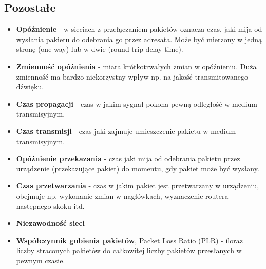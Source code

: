 \documentclass[a4paper]{article}
\begin{document}
\subsection{Pozostałe}
\begin{itemize}
    \item \textbf{Opóźnienie} - w sieciach z przełączaniem pakietów oznacza czas, jaki
mija od wysłania pakietu do odebrania go przez adresata. Może być mierzony w jedną stronę
(one way) lub w dwie (round-trip delay time).
    \item \textbf{Zmienność opóźnienia} - miara krótkotrwałych zmian w opóźnieniu.
Duża zmienność ma bardzo niekorzystny wpływ np. na jakość transmitowanego dźwięku.
    \item \textbf{Czas propagacji} - czas w jakim sygnał pokona pewną odległość w
    medium transmisyjnym.
    \item \textbf{Czas transmisji} - czas jaki zajmuje umieszczenie pakietu w
medium transmisyjnym.
    \item \textbf{Opóźnienie przekazania} - czas jaki mija od odebrania pakietu
przez urządzenie (przekazujące pakiet) do momentu, gdy pakiet może być wysłany.
    \item \textbf{Czas przetwarzania} - czas w jakim pakiet jest przetwarzany w
urządzeniu, obejmuje np. wykonanie zmian w nagłówkach, wyznaczenie routera następnego
skoku itd.
    \item \textbf{Niezawodność sieci}
    \item \textbf{Współczynnik gubienia pakietów}, Packet Loss Ratio (PLR) - iloraz liczby straconych
pakietów do całkowitej liczby pakietów przesłanych w pewnym czasie.
\end{itemize}
\end{document}

